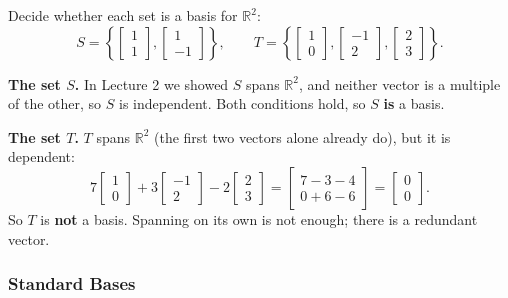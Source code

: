 \begin{example}
Decide whether each set is a basis for $\mathbb{R}^2$:
\[
S = \left\{ \begin{bmatrix} 1 \\ 1 \end{bmatrix}, \begin{bmatrix} 1 \\ -1 \end{bmatrix} \right\},
\qquad
T = \left\{ \begin{bmatrix} 1 \\ 0 \end{bmatrix}, \begin{bmatrix} -1 \\ 2 \end{bmatrix}, \begin{bmatrix} 2 \\ 3 \end{bmatrix} \right\}.
\]

\begin{solution}
\textbf{The set $S$.} In Lecture 2 we showed $S$ spans $\mathbb{R}^2$, and neither vector is a multiple of the other, so $S$ is independent. Both conditions hold, so $S$ \textbf{is} a basis.

\textbf{The set $T$.} $T$ spans $\mathbb{R}^2$ (the first two vectors alone already do), but it is dependent:
\[
7\begin{bmatrix} 1 \\ 0 \end{bmatrix} + 3\begin{bmatrix} -1 \\ 2 \end{bmatrix} - 2\begin{bmatrix} 2 \\ 3 \end{bmatrix} = \begin{bmatrix} 7 - 3 - 4 \\ 0 + 6 - 6 \end{bmatrix} = \begin{bmatrix} 0 \\ 0 \end{bmatrix}.
\]
So $T$ is \textbf{not} a basis. Spanning on its own is not enough; there is a redundant vector.
\end{solution}
\end{example}

\subsubsection{Standard Bases}


